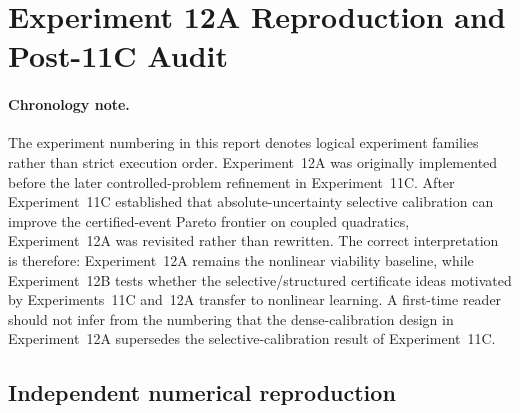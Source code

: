 \section{Experiment 12A Reproduction and Post-11C Audit}
\label{sec:experiment-12a-audit}

\paragraph{Chronology note.}
The experiment numbering in this report denotes logical experiment families rather than strict execution order. Experiment~12A was originally implemented before the later controlled-problem refinement in Experiment~11C. After Experiment~11C established that absolute-uncertainty selective calibration can improve the certified-event Pareto frontier on coupled quadratics, Experiment~12A was revisited rather than rewritten. The correct interpretation is therefore: Experiment~12A remains the nonlinear viability baseline, while Experiment~12B tests whether the selective/structured certificate ideas motivated by Experiments~11C and~12A transfer to nonlinear learning. A first-time reader should not infer from the numbering that the dense-calibration design in Experiment~12A supersedes the selective-calibration result of Experiment~11C.

\subsection{Independent numerical reproduction}

